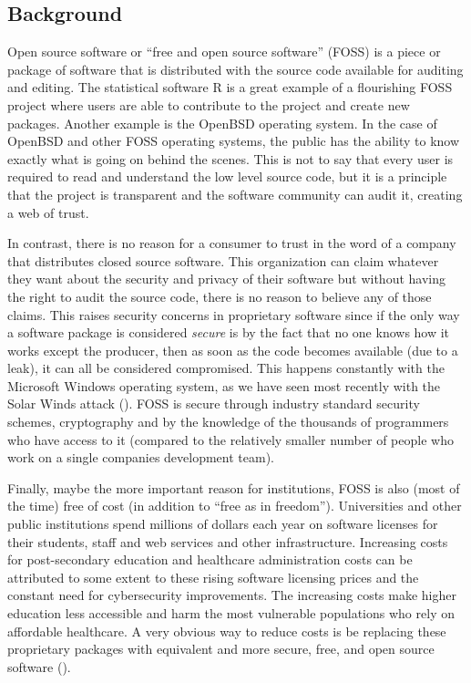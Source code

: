 \documentclass{article}
\theoremstyle{definition}
\begin{document}
\begin{flushleft}
\begin{multicols}{2}

\section{Background}
Open source software or ``free and open source software'' (FOSS)
is a piece or package of software
that is distributed with the source code available for
auditing and editing. The statistical software R is a
great example of a flourishing FOSS project where
users are able to contribute to the project and create new
packages. Another example is the OpenBSD operating system.
In the case of OpenBSD and other FOSS operating systems,
the public has the ability to know exactly what is going
on behind the scenes. This is not to say that every user
is required to read and understand the low level source
code, but it is a principle that the project is transparent
and the software community can audit it, creating a web of trust.

In contrast, there is no reason for a consumer to trust
in the word of a company that distributes closed source
software. This organization can claim whatever they want
about the security and privacy of their software but
without having the right to audit the source code,
there is no reason to believe any of those claims.
This raises security concerns in proprietary software since
if the only way a software package is considered \textit{secure}
is by the fact that no one knows how it works except the producer,
then as soon as the code becomes available (due to a leak), it can
all be considered compromised. This happens constantly with the Microsoft
Windows operating system, as we have seen most recently with the Solar
Winds attack (\cite{solarwinds2021}).
FOSS is secure through industry standard
security schemes, cryptography and by the knowledge of the thousands
of programmers who have access to it (compared to the relatively
smaller number of people who work on a single companies development
team).

Finally, maybe the more important reason for institutions,
FOSS is also (most of the time) free of cost (in addition
to ``free as in freedom'').
Universities and other public institutions
spend millions of dollars each year on software licenses
for their students, staff and web services and other
infrastructure. Increasing costs for post-secondary education and
healthcare administration costs can be attributed to some extent to
these rising software licensing prices and the constant
need for cybersecurity improvements. The increasing costs
make higher education less accessible and harm the most
vulnerable populations who rely on affordable healthcare.
A very obvious way to reduce
costs is be replacing these proprietary packages with equivalent
and more secure, free, and open source software (\cite{kenny2000}).


\end{multicols}
\end{flushleft}
\end{document}
